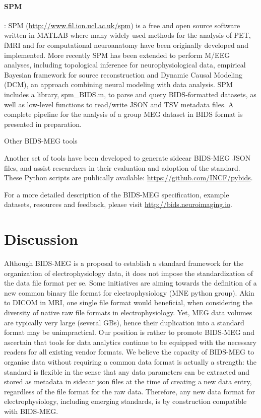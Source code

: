 \paragraph{SPM}\citep{litvak2011eeg}: SPM (\url{http://www.fil.ion.ucl.ac.uk/spm}) is a free and open source software written in MATLAB where many widely used methods for the analysis of PET, fMRI and for computational neuroanatomy have been originally developed and implemented. More recently SPM has been extended to perform M/EEG analyses, including topological inference for neurophysiological data, empirical Bayesian framework for source reconstruction and Dynamic Causal Modeling (DCM), an approach combining neural modeling with data analysis. SPM~\citep{litvak2011eeg} includes a library, spm\_BIDS.m, to parse and query BIDS-formatted datasets, as well as low-level functions to read/write JSON and TSV metadata files. A complete pipeline for the analysis of a group MEG dataset in BIDS format is presented in preparation.

Other BIDS-MEG tools

Another set of tools have been developed to generate sidecar BIDS-MEG JSON files, and assist researchers in their evaluation  and adoption of the standard. These Python scripts are publically available:  \url{https://github.com/INCF/pybids}.

For a more detailed description of the BIDS-MEG specification, example datasets, resources and feedback, please visit \url{http://bids.neuroimaging.io}.

\section{Discussion}
Although BIDS-MEG is a proposal to establish a standard framework for the organization of electrophysiology data, it does not impose the standardization of the data file format per se. Some initiatives are aiming towards the definition of a new common binary file format for electrophysiology (MNE python group). Akin to DICOM in MRI, one single file format would beneficial, when considering the diversity of native raw file formats in electrophysiology. Yet, MEG data volumes are typically very large (several GBs), hence their duplication into a standard format may be unimpractical. Our position is rather to promote BIDS-MEG and ascertain that tools for data analytics continue to be equipped with the necessary readers for all existing vendor formats. We believe the capacity of BIDS-MEG to organise data without requiring a common data format is actually a strength: the standard is flexible in the sense that any data parameters can be extracted and stored as metadata in sidecar json files at the time of creating a new data entry, regardless of the file format for the raw data. Therefore, any new data format for electrophysiology, including emerging standards, is by construction compatible with BIDS-MEG.

